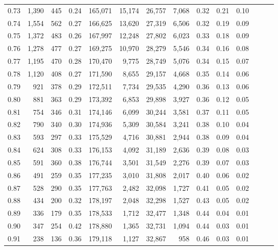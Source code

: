 \begin{tabular}{rrrrrrrrrrrrrr}
0.73 &  1,390 &  445 &  0.24 &  165,071 &   15,174 &  26,757 &   7,068 &  0.32 &  0.21 &      0.10 \\
0.74 &  1,554 &  562 &  0.27 &  166,625 &   13,620 &  27,319 &   6,506 &  0.32 &  0.19 &      0.09 \\
0.75 &  1,372 &  483 &  0.26 &  167,997 &   12,248 &  27,802 &   6,023 &  0.33 &  0.18 &      0.09 \\
0.76 &  1,278 &  477 &  0.27 &  169,275 &   10,970 &  28,279 &   5,546 &  0.34 &  0.16 &      0.08 \\
0.77 &  1,195 &  470 &  0.28 &  170,470 &    9,775 &  28,749 &   5,076 &  0.34 &  0.15 &      0.07 \\
0.78 &  1,120 &  408 &  0.27 &  171,590 &    8,655 &  29,157 &   4,668 &  0.35 &  0.14 &      0.06 \\
0.79 &    921 &  378 &  0.29 &  172,511 &    7,734 &  29,535 &   4,290 &  0.36 &  0.13 &      0.06 \\
0.80 &    881 &  363 &  0.29 &  173,392 &    6,853 &  29,898 &   3,927 &  0.36 &  0.12 &      0.05 \\
0.81 &    754 &  346 &  0.31 &  174,146 &    6,099 &  30,244 &   3,581 &  0.37 &  0.11 &      0.05 \\
0.82 &    790 &  340 &  0.30 &  174,936 &    5,309 &  30,584 &   3,241 &  0.38 &  0.10 &      0.04 \\
0.83 &    593 &  297 &  0.33 &  175,529 &    4,716 &  30,881 &   2,944 &  0.38 &  0.09 &      0.04 \\
0.84 &    624 &  308 &  0.33 &  176,153 &    4,092 &  31,189 &   2,636 &  0.39 &  0.08 &      0.03 \\
0.85 &    591 &  360 &  0.38 &  176,744 &    3,501 &  31,549 &   2,276 &  0.39 &  0.07 &      0.03 \\
0.86 &    491 &  259 &  0.35 &  177,235 &    3,010 &  31,808 &   2,017 &  0.40 &  0.06 &      0.02 \\
0.87 &    528 &  290 &  0.35 &  177,763 &    2,482 &  32,098 &   1,727 &  0.41 &  0.05 &      0.02 \\
0.88 &    434 &  200 &  0.32 &  178,197 &    2,048 &  32,298 &   1,527 &  0.43 &  0.05 &      0.02 \\
0.89 &    336 &  179 &  0.35 &  178,533 &    1,712 &  32,477 &   1,348 &  0.44 &  0.04 &      0.01 \\
0.90 &    347 &  254 &  0.42 &  178,880 &    1,365 &  32,731 &   1,094 &  0.44 &  0.03 &      0.01 \\
0.91 &    238 &  136 &  0.36 &  179,118 &    1,127 &  32,867 &     958 &  0.46 &  0.03 &      0.01 \\

\end{tabular}
